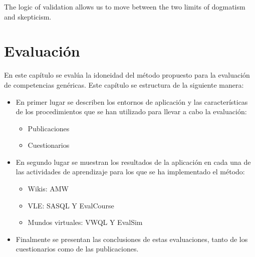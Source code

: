 

\begin{savequote}[50mm]
The logic of validation allows us to move between the two limits of dogmatism and skepticism. 
\end{savequote}


\chapter{Evaluación}
\label{cha:Validation of the methodology}

\ifpdf
    \graphicspath{{5_experiments_and_results/figures/PNG/}{5_experiments_and_results/figures/PDF/}{5_experiments_and_results/figures/}}
\else
    \graphicspath{{5_experiments_and_results/figures/EPS/}{5_experiments_and_results/figures/}}
\fi



En este capítulo se evalúa la idoneidad del método propuesto para la evaluación de competencias genéricas. Este capítulo se estructura de la siguiente manera:

\begin{itemize}
	\item En primer lugar se describen los entornos de aplicación y las características de los procedimientos que se han utilizado para llevar a cabo la evaluación:
		\begin{itemize}
			\item Publicaciones
			\item Cuestionarios
		\end{itemize}
	\item En segundo lugar se muestran los resultados de la aplicación en cada una de las actividades de aprendizaje para los que se ha implementado el método:
		\begin{itemize}
			\item Wikis: AMW
			\item VLE: SASQL Y EvalCourse
			\item Mundos virtuales: VWQL Y EvalSim
		\end{itemize}
	\item Finalmente se presentan las conclusiones de estas evaluaciones, tanto de los cuestionarios como de las publicaciones.
\end{itemize}

